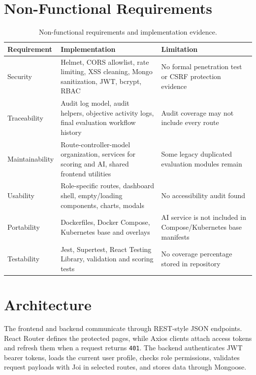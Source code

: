 \section{Non-Functional Requirements}
\begin{table}[H]\centering\small
\caption{Non-functional requirements and implementation evidence.}
\label{tab:nonfunctional-requirements}
\begin{tabularx}{\textwidth}{p{}YY}
\toprule
Requirement & Implementation & Limitation\\
\midrule
Security & Helmet, CORS allowlist, rate limiting, XSS cleaning, Mongo sanitization, JWT, bcrypt, RBAC & No formal penetration test or CSRF protection evidence\\
Traceability & Audit log model, audit helpers, objective activity logs, final evaluation workflow history & Audit coverage may not include every route\\
Maintainability & Route-controller-model organization, services for scoring and AI, shared frontend utilities & Some legacy duplicated evaluation modules remain\\
Usability & Role-specific routes, dashboard shell, empty/loading components, charts, modals & No accessibility audit found\\
Portability & Dockerfiles, Docker Compose, Kubernetes base and overlays & AI service is not included in Compose/Kubernetes base manifests\\
Testability & Jest, Supertest, React Testing Library, validation and scoring tests & No coverage percentage stored in repository\\
\bottomrule
\end{tabularx}
\end{table}

\section{Architecture}
The frontend and backend communicate through REST-style JSON endpoints. React Router defines the protected pages, while Axios clients attach access tokens and refresh them when a request returns \texttt{401}. The backend authenticates JWT bearer tokens, loads the current user profile, checks role permissions, validates request payloads with Joi in selected routes, and stores data through Mongoose.







